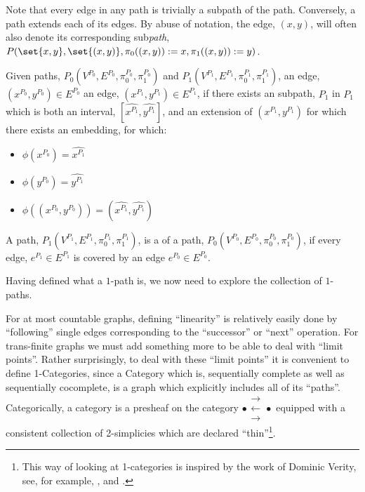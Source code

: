\documentclass[a4paper]{amsart}
\begin{document}
Note that every edge in any path is trivially a subpath of the path. Conversely, a path
extends each of its edges. By abuse of notation, the edge, $(x,y)$, will often also denote
its corresponding sub\emph{path}, $P(\set{x,y}, \set{(x,y)}, \pi_0((x,y)):=x,
\pi_1((x,y)):=y)$.

\begin{definition}
Given paths, $P_0(V^{P_0}, E^{P_0}, \pi^{P_0}_0, \pi^{P_0}_1)$ and $P_1(V^{P_1}, E^{P_1},
\pi^{P_1}_0, \pi^{P_1}_1)$, an edge, $(x^{P_0}, y^{P_0}) \in E^{P_0}$  an
edge, $(x^{P_1}, y^{P_1}) \in E^{P_1}$, if there exists an subpath, $\hat{P_1}$ in $P_1$
which is both an interval, $[\hat{x^{P_1}}, \hat{y^{P_1}}]$, and an extension of
$(x^{P_1}, y^{P_1})$ for which there exists an embedding,  for which:
\begin{itemize}
\item $\phi(x^{P_0}) = \hat{x^{P_1}}$
\item $\phi(y^{P_0}) = \hat{y^{P_1}}$
\item $\phi( (x^{P_0}, y^{P_0}) ) = (\hat{x^{P_1}}, \hat{y^{P_1}})$
\end{itemize}
\end{definition}

\begin{definition}
A path, $P_1(V^{P_1}, E^{P_1}, \pi^{P_1}_0, \pi^{P_1}_1)$, is a  of a
path, $P_0(V^{P_0}, E^{P_0}, \pi^{P_0}_0, \pi^{P_0}_1)$, if every edge, $e^{P_1} \in 
E^{P_1}$ is covered by an edge $e^{P_0} \in E^{P_0}$.
\end{definition}

Having defined what a $1$-path is, we now need to explore the collection of $1$-paths.



For at most countable graphs, defining ``linearity'' is relatively easily done by
``following'' single edges corresponding to the ``successor'' or ``next'' operation. For
trans-finite graphs we must add something more to be able to deal with ``limit points''.
Rather surprisingly, to deal with these ``limit points'' it is convenient to define
1-Categories, since a Category which is, sequentially complete as well as sequentially
cocomplete, is a graph which explicitly includes all of its ``paths''. Categorically, a
category is a presheaf on the category
$ \bullet \substack{\mathbf{\longrightarrow} \\[-0.7ex] \mathbf{\longleftarrow} 
\\[-0.7ex] \mathbf{\longrightarrow} } \bullet $
equipped with a consistent collection of 2-simplicies which are declared
``thin''\footnote{This way of looking at 1-categories is inspired by the work of Dominic
Verity, see, for example, \cite{verity2005complicialSets},
\cite{verity2006complicialSimplicialHomotopy} and
\cite{verity2006simplicialComplicialCategories}.}.
\end{document}
